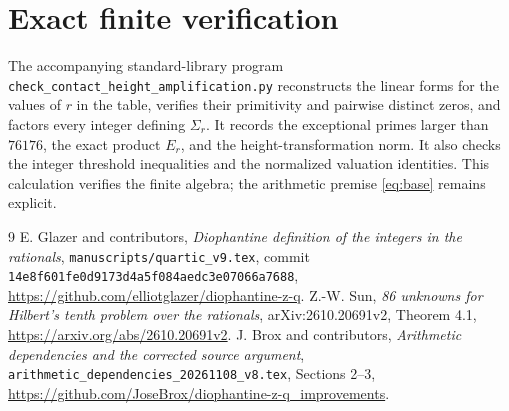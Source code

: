 \documentclass[11pt,a4paper]{article}
\theoremstyle{definition}\newtheorem{definition}[theorem]{Definition}
\begin{document}
\section{Exact finite verification}

The accompanying standard-library program
\nolinkurl{check_contact_height_amplification.py} reconstructs the
linear forms for the values of $r$ in the table, verifies their
primitivity and pairwise distinct zeros, and factors every integer
defining $\Sigma_r$. It records the exceptional primes larger than
$76176$, the exact product $E_r$, and the height-transformation norm.
It also checks the integer threshold inequalities and the normalized
valuation identities. This calculation verifies the finite algebra;
the arithmetic premise \eqref{eq:base} remains explicit.

\begin{thebibliography}{9}
 E. Glazer and contributors,
\emph{Diophantine definition of the integers in the rationals},
\texttt{manuscripts/quartic\_v9.tex}, commit
\texttt{14e8f601fe0d9173d4a5f084aedc3e07066a7688},
\url{https://github.com/elliotglazer/diophantine-z-q}.
 Z.-W. Sun,
\emph{86 unknowns for Hilbert's tenth problem over the rationals},
arXiv:2610.20691v2, Theorem 4.1,
\url{https://arxiv.org/abs/2610.20691v2}.
 J. Brox and contributors,
\emph{Arithmetic dependencies and the corrected source argument},
\texttt{arithmetic\_dependencies\_20261108\_v8.tex},
Sections 2--3,
\url{https://github.com/JoseBrox/diophantine-z-q_improvements}.
\end{thebibliography}
\end{document}
